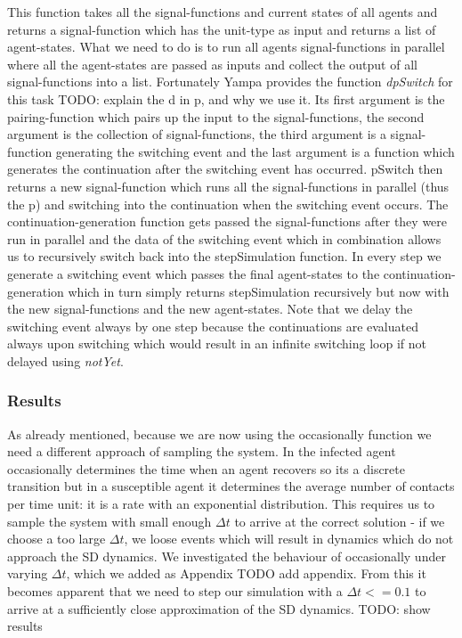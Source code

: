 This function takes all the signal-functions and current states of all agents and returns a signal-function which has the unit-type as input and returns a list of agent-states. What we need to do is to run all agents signal-functions in parallel where all the agent-states are passed as inputs and collect the output of all signal-functions into a list. Fortunately Yampa provides the function \textit{dpSwitch} for this task TODO: explain the d in p, and why we use it. Its first argument is the pairing-function which pairs up the input to the signal-functions, the second argument is the collection of signal-functions, the third argument is a signal-function generating the switching event and the last argument is a function which generates the continuation after the switching event has occurred.
pSwitch then returns a new signal-function which runs all the signal-functions in parallel (thus the p) and switching into the continuation when the switching event occurs. The continuation-generation function gets passed the signal-functions after they were run in parallel and the data of the switching event which in combination allows us to recursively switch back into the stepSimulation function. In every step we generate a switching event which passes the final agent-states to the continuation-generation which in turn simply returns stepSimulation recursively but now with the new signal-functions and the new agent-states. Note that we delay the switching event always by one step because the continuations are evaluated always upon switching which would result in an infinite switching loop if not delayed using \textit{notYet}.

\subsubsection{Results}
As already mentioned, because we are now using the occasionally function we need a different approach of sampling the system. In the infected agent occasionally determines the time when an agent recovers so its a discrete transition but in a susceptible agent it determines the average number of contacts per time unit: it is a rate with an exponential distribution. This requires us to sample the system with small enough $\Delta t$ to arrive at the correct solution - if we choose a too large $\Delta t$, we loose events which will result in dynamics which do not approach the SD dynamics.
We investigated the behaviour of occasionally under varying $\Delta t$, which we added as Appendix TODO add appendix. From this it becomes apparent that we need to step our simulation with a $\Delta t <= 0.1$ to arrive at a sufficiently close approximation of the SD dynamics.
TODO: show results

